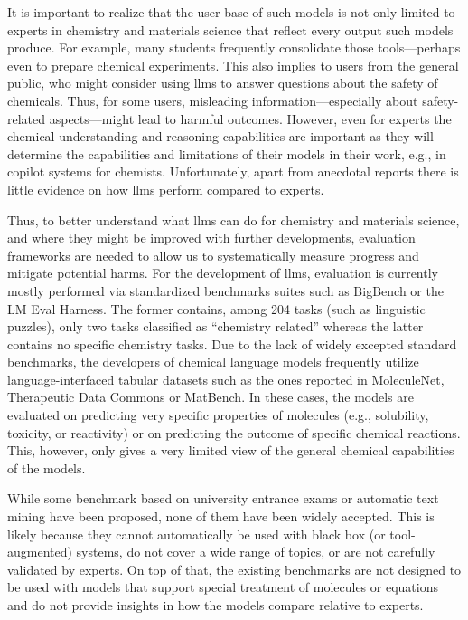 \documentclass[11pt, oneside]{article}
\begin{document}
It is important to realize that the user base of such models is not only limited to experts in chemistry and materials science that reflect every output such models produce. 
For example, many students frequently consolidate those tools---perhaps even to prepare chemical experiments.\cite{Intelligent.com_2023}
This also implies to users from the general public, who might consider using \glspl{llm} to answer questions about the safety of chemicals.
Thus, for some users, misleading information---especially about safety-related aspects---might lead to harmful outcomes. 
However, even for experts the chemical understanding and reasoning capabilities are important as they will determine the capabilities and limitations of their models in their work, e.g., in copilot systems for chemists.
Unfortunately, apart from anecdotal reports there is little evidence on how \glspl{llm} perform compared to experts.

Thus, to better understand what \glspl{llm} can do for chemistry and materials science, and where they might be improved with further developments, evaluation frameworks are needed to allow us to systematically measure progress and mitigate potential harms.
For the development of \glspl{llm}, evaluation is currently mostly performed via standardized benchmarks suites such as BigBench\cite{srivastava2022beyond} or the LM Eval Harness.\cite{eval-harness}
The former contains, among 204 tasks (such as linguistic puzzles), only two tasks classified as \enquote{chemistry related} whereas the latter contains no specific chemistry tasks.
Due to the lack of widely excepted standard benchmarks, the developers of chemical language models\cite{jablonka2024leveraging, guo2023large, ahmad2022chemberta2, Cai_2024, frey2023neural} frequently utilize language-interfaced\cite{dinh2022lift} tabular datasets such as the ones reported in MoleculeNet,\cite{wu2018moleculenet} Therapeutic Data Commons\cite{huang2021therapeutics} or MatBench.\cite{dunn2020benchmarking}
In these cases, the models are  evaluated on predicting very specific properties of molecules (e.g., solubility, toxicity, or reactivity) or on predicting the outcome of specific chemical reactions.
This, however, only gives a very limited view of the general chemical capabilities of the models.

While some benchmark based on university entrance exams\cite{Zaki_2024, arora2023llms} or automatic text mining\cite{song2023honeybee, wei2021chemistryqa} have been proposed, none of them have been widely accepted.
This is likely because they cannot automatically be used with black box (or tool-augmented) systems, do not cover a wide range of topics, or are not carefully validated by experts.
On top of that, the existing benchmarks are not designed to be used with models that support special treatment of molecules or equations and do not provide insights in how the models compare relative to experts.
\end{document}
